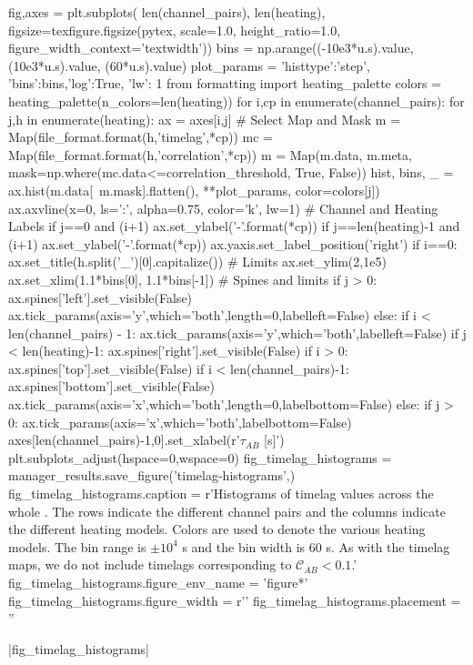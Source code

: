 \begin{pycode}
fig,axes = plt.subplots(
    len(channel_pairs), len(heating),
    figsize=texfigure.figsize(pytex, scale=1.0, height_ratio=1.0,
                              figure_width_context='textwidth'))
bins = np.arange((-10e3*u.s).value, (10e3*u.s).value, (60*u.s).value)
plot_params = {'histtype':'step', 'bins':bins,'log':True,
               'lw': 1}
from formatting import heating_palette
colors = heating_palette(n_colors=len(heating))
for i,cp in enumerate(channel_pairs):
    for j,h in enumerate(heating):
        ax = axes[i,j]
        # Select Map and Mask
        m = Map(file_format.format(h,'timelag',*cp))
        mc = Map(file_format.format(h,'correlation',*cp))
        m = Map(m.data, m.meta, mask=np.where(mc.data<=correlation_threshold, True, False))
        hist, bins, _ = ax.hist(m.data[~m.mask].flatten(), **plot_params, color=colors[j])
        ax.axvline(x=0, ls=':', alpha=0.75, color='k', lw=1)
        # Channel and Heating Labels
        if j==0 and (i+1)%
            ax.set_ylabel('{}-{}'.format(*cp))
        if j==len(heating)-1 and (i+1)%
            ax.set_ylabel('{}-{}'.format(*cp))
            ax.yaxis.set_label_position('right')
        if i==0:
            ax.set_title(h.split('_')[0].capitalize())
        # Limits
        ax.set_ylim(2,1e5)
        ax.set_xlim(1.1*bins[0], 1.1*bins[-1])
        # Spines and limits
        if j > 0:
            ax.spines['left'].set_visible(False)
            ax.tick_params(axis='y',which='both',length=0,labelleft=False)
        else:
            if i < len(channel_pairs) - 1:
                ax.tick_params(axis='y',which='both',labelleft=False)
        if j < len(heating)-1:
            ax.spines['right'].set_visible(False)
        if i > 0:
            ax.spines['top'].set_visible(False)
        if i < len(channel_pairs)-1:
            ax.spines['bottom'].set_visible(False)
            ax.tick_params(axis='x',which='both',length=0,labelbottom=False)
        else:
            if j > 0:
                ax.tick_params(axis='x',which='both',labelbottom=False)
axes[len(channel_pairs)-1,0].set_xlabel(r'$\tau_{AB}$ [s]')
plt.subplots_adjust(hspace=0,wspace=0)
fig_timelag_histograms = manager_results.save_figure('timelag-histograms',)
fig_timelag_histograms.caption = r'Histograms of timelag values across the whole \AR{}. The rows indicate the different channel pairs and the columns indicate the different heating models. Colors are used to denote the various heating models. The bin range is $\pm10^4$ s and the bin width is 60 s. As with the timelag maps, we do not include timelags corresponding to $\mathcal{C}_{AB}<0.1$.'
fig_timelag_histograms.figure_env_name = 'figure*'
fig_timelag_histograms.figure_width = r'\textwidth'
fig_timelag_histograms.placement = ''
\end{pycode}
|fig_timelag_histograms|

